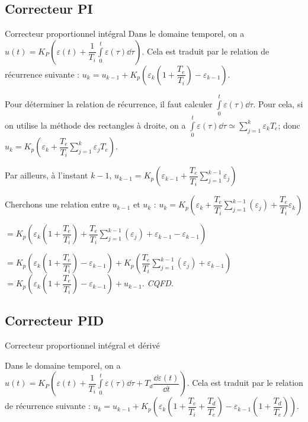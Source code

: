 \subsection{Correcteur PI}
\begin{defi}{Correcteur proportionnel intégral}
Dans le domaine temporel, on a $u(t)=K_P  \left(\varepsilon(t)+\dfrac{1}{T_i}\int\limits_0^t \varepsilon(\tau) \dd \tau \right)$. Cela est traduit par le relation de récurrence suivante : 
$u_k = u_{k-1} +  K_p \left( \varepsilon_k \left( 1+\dfrac{T_e}{T_i}\right) - \varepsilon_{k-1} \right)$.
\end{defi}

\begin{demo}
Pour déterminer la relation de récurrence, il faut calculer $\int\limits_0^t \varepsilon(\tau) \dd \tau$. 
Pour cela, si on utilise la méthode des rectangles à droite, on a 
$\int\limits_0^t \varepsilon(\tau) \dd \tau \simeq \sum\limits_{j=1}^k \varepsilon_k T_e$; donc 
$u_k = K_p\left(\varepsilon_k + \dfrac{T_e}{T_i}\sum\limits_{j=1}^k \varepsilon_j T_e\right)$.

Par ailleurs, à l'instant $k-1$, $u_{k-1} = K_p\left(\varepsilon_{k-1} + \dfrac{T_e}{T_i}\sum\limits_{j=1}^{k-1} \varepsilon_j \right)$


Cherchons une relation entre $u_{k-1}$ et $u_{k}$ : 
$u_k = K_p\left(\varepsilon_k + \dfrac{T_e}{T_i}\sum\limits_{j=1}^{k-1} \left(\varepsilon_j \right) + \dfrac{T_e}{T_i} \varepsilon_k \right)$

$= K_p\left(\varepsilon_k \left(1+\dfrac{T_e}{T_i}\right)+ \dfrac{T_e}{T_i}\sum\limits_{j=1}^{k-1} \left(\varepsilon_j \right) + \varepsilon_{k-1} - \varepsilon_{k-1}\right)$

$= K_p\left(\varepsilon_k \left(1+\dfrac{T_e}{T_i}\right) - \varepsilon_{k-1}\right)
+ K_p\left(\dfrac{T_e}{T_i}\sum\limits_{j=1}^{k-1} \left(\varepsilon_j \right) + \varepsilon_{k-1} \right) $
$= K_p\left(\varepsilon_k \left(1+\dfrac{T_e}{T_i}\right) - \varepsilon_{k-1}\right) + u_{k-1} $. \textit{CQFD.}
\end{demo}


\subsection{Correcteur PID}
\begin{defi}{Correcteur proportionnel intégral et dérivé}

Dans le domaine temporel, on a $u(t)=K_P  \left(\varepsilon(t)+\dfrac{1}{T_i}\int\limits_0^t \varepsilon(\tau) \dd \tau +T_d \dfrac{\dd \varepsilon(t)}{\dd t}\right)$. Cela est traduit par le relation de récurrence suivante : 
$u_k = u_{k-1} + K_p \left( \varepsilon_k \left( 1+\dfrac{T_e}{T_i}+\dfrac{T_d}{T_e}\right) - \varepsilon_{k-1} \left( 1+\dfrac{T_d}{T_e}\right)\right)$.

\end{defi}

